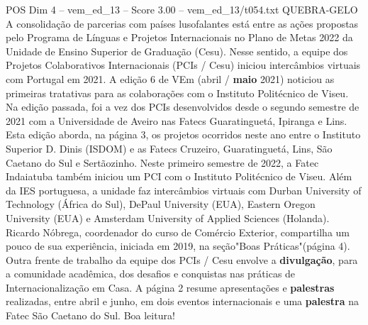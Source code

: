 \begin{textsample}{POS Dim 4 – vem\_ed\_13 – Score 3.00 – vem\_ed\_13/t054.txt}  \label{ex:f4_pos_029}
QUEBRA-GELO A consolidação de parcerias com países lusofalantes está entre as ações propostas pelo Programa de Línguas e Projetos Internacionais no Plano de Metas 2022 da Unidade de Ensino Superior de Graduação (Cesu).
Nesse sentido, a equipe dos Projetos Colaborativos Internacionais (PCIs / Cesu) iniciou intercâmbios virtuais com Portugal em 2021.
A edição 6 de VEm (abril / \textbf{maio} 2021) noticiou as primeiras tratativas para as colaborações com o Instituto Politécnico de Viseu.
Na edição passada, foi a vez dos PCIs desenvolvidos desde o segundo semestre de 2021 com a Universidade de Aveiro nas Fatecs Guaratinguetá, Ipiranga e Lins.
Esta edição aborda, na página 3, os projetos ocorridos neste ano entre o Instituto Superior D.
Dinis (ISDOM) e as Fatecs Cruzeiro, Guaratinguetá, Lins, São Caetano do Sul e Sertãozinho.
Neste primeiro semestre de 2022, a Fatec Indaiatuba também iniciou um PCI com o Instituto Politécnico de Viseu.
Além da IES portuguesa, a unidade faz intercâmbios virtuais com Durban University of Technology (África do Sul), DePaul University (EUA), Eastern Oregon University (EUA) e Amsterdam University of Applied Sciences (Holanda).
Ricardo Nóbrega, coordenador do curso de Comércio Exterior, compartilha um pouco de sua experiência, iniciada em 2019, na seção"Boas Práticas"(página 4).
Outra frente de trabalho da equipe dos PCIs / Cesu envolve a \textbf{divulgação}, para a comunidade acadêmica, dos desafios e conquistas nas práticas de Internacionalização em Casa.
A página 2 resume apresentações e \textbf{palestras} realizadas, entre abril e junho, em dois eventos internacionais e uma \textbf{palestra} na Fatec São Caetano do Sul.
Boa leitura!

\end{textsample}
